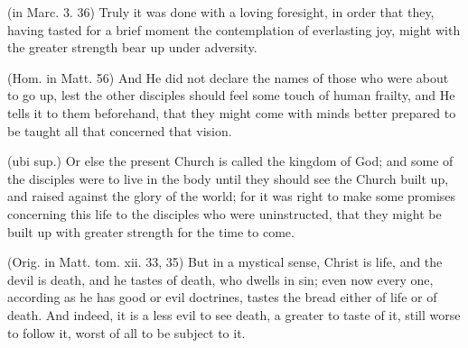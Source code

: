  (in Marc. 3. 36) Truly it was done with a loving foresight, in order that they, having tasted for a brief moment the contemplation of everlasting joy, might with the greater strength bear up under adversity.

 (Hom. in Matt. 56) And He did not declare the names of those who were about to go up, lest the other disciples should feel some touch of human frailty, and He tells it to them beforehand, that they might come with minds better prepared to be taught all that concerned that vision.

 (ubi sup.) Or else the present Church is called the kingdom of God; and some of the disciples were to live in the body until they should see the Church built up, and raised against the glory of the world; for it was right to make some promises concerning this life to the disciples who were uninstructed, that they might be built up with greater strength for the time to come.

 (Orig. in Matt. tom. xii. 33, 35) But in a mystical sense, Christ is life, and the devil is death, and he tastes of death, who dwells in sin; even now every one, according as he has good or evil doctrines, tastes the bread either of life or of death. And indeed, it is a less evil to see death, a greater to taste of it, still worse to follow it, worst of all to be subject to it.


 

